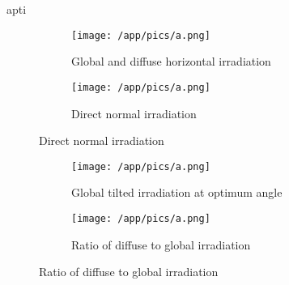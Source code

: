 apti     \documentclass[10pt,a4paper,UTF8]{article}
\begin{document}
{%
\newpage%
\begin{figure}[H]  %
    \begin{minipage}[t]{0.48\textwidth}
    \centering
    \begin{figure}[H]
    \vspace*{-5mm}
    \caption{ Global and diffuse horizontal irradiation }
    \texttt{[image: /app/pics/a.png]}
    \end{figure}
    \end{minipage}
    \hfill
\centering
    \begin{minipage}[t]{0.48\textwidth}
    \centering
    \begin{figure}[H]
    \vspace*{-5mm}
    \caption{ Direct normal irradiation }
    \texttt{[image: /app/pics/a.png]}
    \end{figure}
    \end{minipage}
    \hfill
\end{figure}%
\begin{figure}[H]  %
    \begin{minipage}[t]{0.48\textwidth}
    \centering
    \begin{figure}[H]
    \vspace*{-5mm}
    \caption{ Global tilted irradiation at optimum angle }
    \texttt{[image: /app/pics/a.png]}
    \end{figure}
    \end{minipage}
    \hfill
\centering
    \begin{minipage}[t]{0.48\textwidth}
    \centering
    \begin{figure}[H]
    \vspace*{-5mm}
    \caption{ Ratio of diffuse to global irradiation }
    \texttt{[image: /app/pics/a.png]}

\end{figure}
\end{minipage}
\end{figure}}
\end{document}

